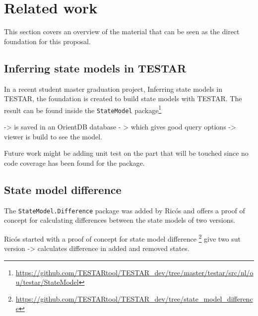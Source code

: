 \section{Related work} \label{releatedWork}
    
    This section covers an overview of the material that can be seen as the direct foundation for this proposal.
    
    
    
    \subsection{Inferring state models in TESTAR}
    In a recent student master graduation project, Inferring state models in TESTAR, \cite{thesisMulders}  the foundation is created to build state models with TESTAR. The result can be found inside the \verb|StateModel| package\footnote{\url{https://github.com/TESTARtool/TESTAR_dev/tree/master/testar/src/nl/ou/testar/StateModel}}
    
    -> is saved in an OrientDB database - > which gives good query options -> viewer is build to see the model. 
        
    Future work might be adding unit test on the part that will be touched since no code coverage has been found for the package.

        
        
        


    \subsection{State model difference}
        The \verb|StateModel.Difference| package was added by Ricós\cite{stateDiff} and offers a proof of concept for calculating differences between the state models of two versions. 
        
        Ricós started with a proof of concept for state model difference \footnote{\url{https://github.com/TESTARtool/TESTAR_dev/tree/state_model_difference}}
        give two sut version -> calculates difference in added and removed states.
        
